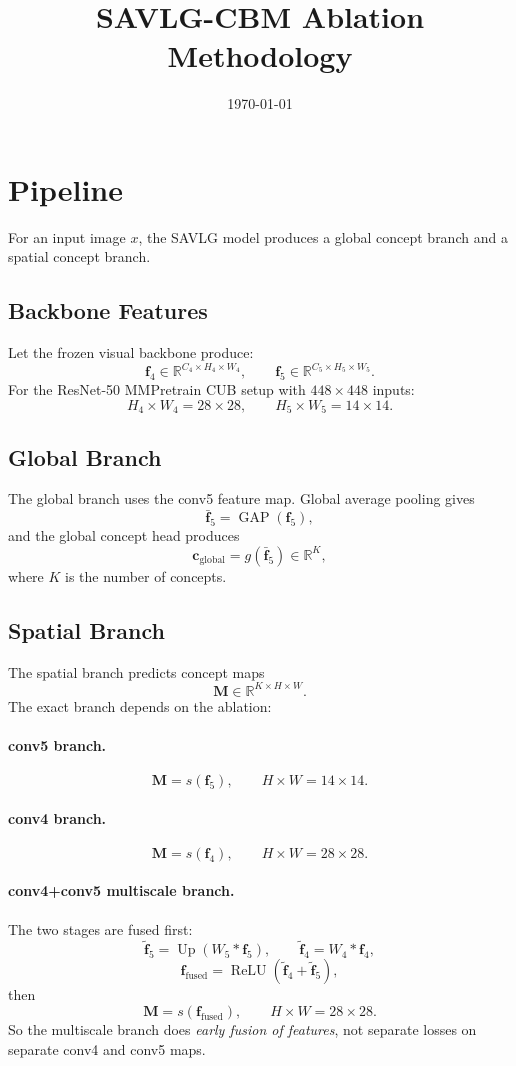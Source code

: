 \documentclass[11pt]{article}
\title{SAVLG-CBM Ablation Methodology}
\author{}
\date{\today}
\begin{document}
\maketitle

\section{Pipeline}
For an input image $x$, the SAVLG model produces a global concept branch and a
spatial concept branch.

\subsection{Backbone Features}
Let the frozen visual backbone produce:
\[
\mathbf{f}_4 \in \mathbb{R}^{C_4 \times H_4 \times W_4},
\qquad
\mathbf{f}_5 \in \mathbb{R}^{C_5 \times H_5 \times W_5}.
\]
For the ResNet-50 MMPretrain CUB setup with $448 \times 448$ inputs:
\[
H_4 \times W_4 = 28 \times 28,
\qquad
H_5 \times W_5 = 14 \times 14.
\]

\subsection{Global Branch}
The global branch uses the conv5 feature map. Global average pooling gives
\[
\bar{\mathbf{f}}_5 = \operatorname{GAP}(\mathbf{f}_5),
\]
and the global concept head produces
\[
\mathbf{c}_{\mathrm{global}} = g(\bar{\mathbf{f}}_5) \in \mathbb{R}^{K},
\]
where $K$ is the number of concepts.

\subsection{Spatial Branch}
The spatial branch predicts concept maps
\[
\mathbf{M} \in \mathbb{R}^{K \times H \times W}.
\]
The exact branch depends on the ablation:

\paragraph{conv5 branch.}
\[
\mathbf{M} = s(\mathbf{f}_5),
\qquad
H \times W = 14 \times 14.
\]

\paragraph{conv4 branch.}
\[
\mathbf{M} = s(\mathbf{f}_4),
\qquad
H \times W = 28 \times 28.
\]

\paragraph{conv4+conv5 multiscale branch.}
The two stages are fused first:
\[
\tilde{\mathbf{f}}_5 = \operatorname{Up}\!\left(W_5 * \mathbf{f}_5\right),
\qquad
\tilde{\mathbf{f}}_4 = W_4 * \mathbf{f}_4,
\]
\[
\mathbf{f}_{\mathrm{fused}} = \operatorname{ReLU}\!\left(\tilde{\mathbf{f}}_4 + \tilde{\mathbf{f}}_5\right),
\]
then
\[
\mathbf{M} = s(\mathbf{f}_{\mathrm{fused}}),
\qquad
H \times W = 28 \times 28.
\]
So the multiscale branch does \emph{early fusion of features}, not separate
losses on separate conv4 and conv5 maps.
\end{document}
